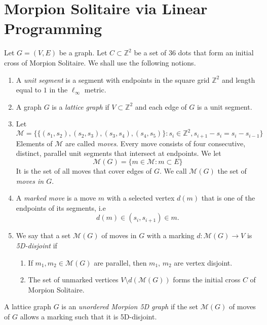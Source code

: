 \documentclass[a4paper,UKenglish]{lipics}
\begin{document}
\section{Morpion Solitaire via Linear Programming}
\label{sec:linear}

\begin{definition}
  Let $G = (V, E)$ be a graph. 
  Let $C \subset \mathbb{Z}^2$ be a set of $36$ dots that form an initial cross of Morpion Solitaire.
  We shall use the following notions.
  \begin{enumerate}
    \item A \emph{unit segment} is a segment with endpoints in the square grid $\mathbb{Z}^2$ and length 
    	equal to $1$ in the $\ell_\infty$ metric.
    \item A graph $G$ is a \emph{lattice graph} if $V \subset \mathbb{Z}^2$
      and each edge of $G$ is a unit segment.
    \item Let 
    \[
      \mathcal{M} = \{ \{ (s_1, s_2), (s_2, s_3), (s_3, s_4), (s_4, s_5) \} \colon s_i \in \mathbb{Z}^2, s_{i+1} - s_i = s_i - s_{i-1} \}
    \]
    Elements of $\mathcal{M}$ are called \emph{moves}. 
    Every move consists of four consecutive, distinct, parallel unit segments that intersect at endpoints.
    We let
    \[
      \mathcal{M}(G) = \{ m \in \mathcal{M} \colon m \subset E \}
    \]
    It is the set of all moves that cover edges of $G$. We call $\mathcal{M}(G)$ the set of \emph{moves in $G$}.
    \item A \emph{marked move} is a move $m$ with a selected vertex $d(m)$ that is one of the endpoints
      of its segments, i.e
      \[
      	d(m) \in (s_i, s_{i+1}) \in m.
      \]
    \item We say that a set $\mathcal{M}(G)$ of moves in $G$ with a marking $d \colon \mathcal{M}(G) \to V$ is \emph{5D-disjoint} if
      \begin{enumerate}
        \item If $m_1, m_2 \in \mathcal{M}(G)$ are parallel, then $m_1$, $m_2$ are vertex disjoint.
        \item The set of unmarked vertices $V \setminus d(\mathcal{M}(G))$ forms the initial cross $C$ of Morpion Solitaire.
      \end{enumerate}
  \end{enumerate}
\end{definition}

\begin{definition}
  A lattice graph $G$ is an \emph{unordered Morpion 5D graph} if the set $\mathcal{M}(G)$ of moves of $G$ allows a marking such that it is 5D-disjoint.
\end{definition}
\end{document}
